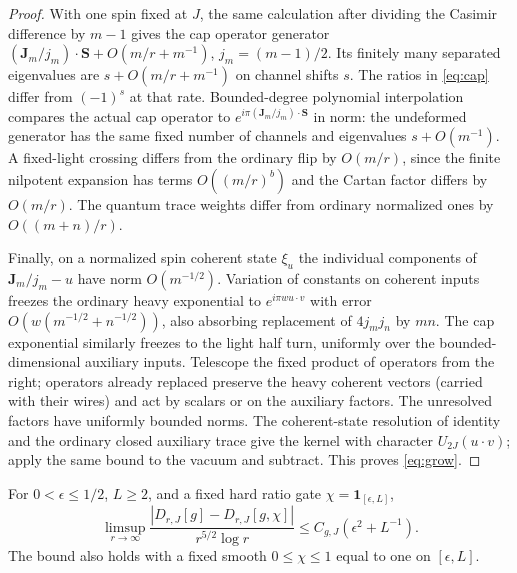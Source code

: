 \begin{proof}
With one spin fixed at \(J\), the same calculation after dividing the Casimir difference by \(m-1\) gives the cap operator generator \((\mathbf J_m/j_m)\cdot\mathbf S+O(m/r+m^{-1})\), \(j_m=(m-1)/2\). Its finitely many separated eigenvalues are \(s+O(m/r+m^{-1})\) on channel shifts \(s\). The ratios in \eqref{eq:cap} differ from \((-1)^s\) at that rate. Bounded-degree polynomial interpolation compares the actual cap operator to \(e^{i\pi(\mathbf J_m/j_m)\cdot\mathbf S}\) in norm: the undeformed generator has the same fixed number of channels and eigenvalues \(s+O(m^{-1})\). A fixed-light crossing differs from the ordinary flip by \(O(m/r)\), since the finite nilpotent expansion has terms \(O((m/r)^b)\) and the Cartan factor differs by \(O(m/r)\). The quantum trace weights differ from ordinary normalized ones by \(O((m+n)/r)\).

Finally, on a normalized spin coherent state \(\xi_u\) the individual components of \(\mathbf J_m/j_m-u\) have norm \(O(m^{-1/2})\). Variation of constants on coherent inputs freezes the ordinary heavy exponential to \(e^{i\pi w u\cdot v}\) with error \(O(w(m^{-1/2}+n^{-1/2}))\), also absorbing replacement of \(4j_mj_n\) by \(mn\). The cap exponential similarly freezes to the light half turn, uniformly over the bounded-dimensional auxiliary inputs. Telescope the fixed product of operators from the right; operators already replaced preserve the heavy coherent vectors (carried with their wires) and act by scalars or on the auxiliary factors. The unresolved factors have uniformly bounded norms. The coherent-state resolution of identity and the ordinary closed auxiliary trace give the kernel with character \(U_{2J}(u\cdot v)\); apply the same bound to the vacuum and subtract. This proves \eqref{eq:grow}.
\end{proof}

\begin{proposition}\label{prop:ratio-tail}
For \(0<\epsilon\le1/2\), \(L\ge2\), and a fixed hard ratio gate \(\chi=\mathbf1_{[\epsilon,L]}\),
\[
 \limsup_{r\to\infty}
   \frac{|D_{r,J}[g]-D_{r,J}[g,\chi]|}{r^{5/2}\log r}
       \le C_{g,J}(\epsilon^2+L^{-1}).
\]
The bound also holds with a fixed smooth \(0\le\chi\le1\) equal to one on \([\epsilon,L]\).
\end{proposition}

